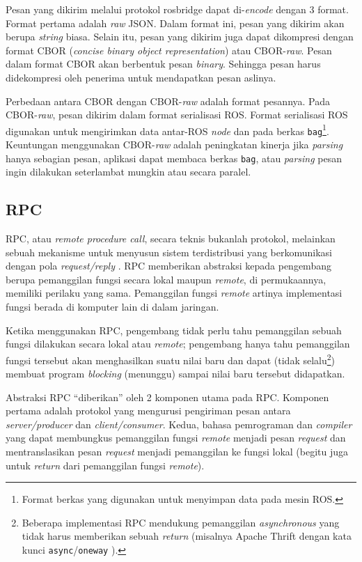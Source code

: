 Pesan yang dikirim melalui protokol rosbridge dapat di-\textit{encode} dengan 3
format. Format pertama adalah \textit{raw} JSON. Dalam format ini, pesan yang
dikirim akan berupa \textit{string} biasa. Selain itu, pesan yang dikirim juga
dapat dikompresi dengan format CBOR (\textit{concise binary object
    representation}) atau CBOR-\textit{raw}. Pesan dalam format CBOR akan berbentuk
pesan \textit{binary}. Sehingga pesan harus didekompresi oleh penerima untuk
mendapatkan pesan aslinya.

Perbedaan antara CBOR dengan CBOR-\textit{raw} adalah format pesannya. Pada
CBOR-\textit{raw}, pesan dikirim dalam format serialisasi ROS. Format
serialisasi ROS digunakan untuk mengirimkan data antar-ROS \textit{node} dan
pada berkas \texttt{bag}\footnote{Format berkas yang digunakan untuk menyimpan
    data pada mesin ROS.}. Keuntungan menggunakan CBOR-\textit{raw} adalah
peningkatan kinerja jika \textit{parsing} hanya sebagian pesan, aplikasi dapat
membaca berkas \texttt{bag}, atau \textit{parsing} pesan ingin dilakukan
seterlambat mungkin atau secara paralel.

\subsection{RPC}

RPC, atau \textit{remote procedure call}, secara teknis bukanlah protokol,
melainkan sebuah mekanisme untuk menyusun sistem terdistribusi yang
berkomunikasi dengan pola \textit{request/reply}
\parencite{larry_computerNetwork}. RPC memberikan abstraksi kepada pengembang
berupa pemanggilan fungsi secara lokal maupun \textit{remote}, di permukaannya,
memiliki perilaku yang sama. Pemanggilan fungsi \textit{remote} artinya
implementasi fungsi berada di komputer lain di dalam jaringan.

Ketika menggunakan RPC, pengembang tidak perlu tahu pemanggilan sebuah fung\-si
dilakukan secara lokal atau \textit{remote}; pengembang hanya tahu pemanggilan
fungsi tersebut akan menghasilkan suatu nilai baru dan dapat (tidak
selalu\footnote{Beberapa implementasi RPC mendukung pemanggilan
    \textit{asynchronous} yang tidak harus memberikan sebuah \textit{return}
    (misalnya Apache Thrift dengan kata kunci \texttt{async}/\texttt{oneway}
    \parencite{agarwal_thrift}).})
membuat program \textit{blocking} (menunggu) sampai nilai baru tersebut
didapatkan.

Abstraksi RPC ``diberikan'' oleh 2 komponen utama pada RPC. Komponen pertama
adalah protokol yang mengurusi pengiriman pesan antara \textit{server/producer}
dan \textit{client/consumer}. Kedua, bahasa pemrograman dan \textit{compiler}
yang dapat membungkus pemanggilan fungsi \textit{remote} menjadi pesan
\textit{request} dan mentranslasikan pesan \textit{request} menjadi pemanggilan
ke fungsi lokal (begitu juga untuk \textit{return} dari pemanggilan fungsi
\textit{remote}).

